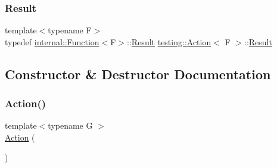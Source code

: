 \mbox{\label{classtesting_1_1_action_a9af08a21ad329331fde856cba9b6dea2}} 
\subsubsection{\texorpdfstring{Result}{Result}\hspace{0.1cm}{\footnotesize\ttfamily [3/3]}}
{\footnotesize\ttfamily template$<$typename F$>$ \\
typedef \mbox{\hyperlink{structtesting_1_1internal_1_1_function}{internal\+::\+Function}}$<$F$>$\+::\mbox{\hyperlink{classtesting_1_1_action_a9af08a21ad329331fde856cba9b6dea2}{Result}} \mbox{\hyperlink{classtesting_1_1_action}{testing\+::\+Action}}$<$ F $>$\+::\mbox{\hyperlink{classtesting_1_1_action_a9af08a21ad329331fde856cba9b6dea2}{Result}}}



\subsection{Constructor \& Destructor Documentation}
\mbox{\label{classtesting_1_1_action_a9e72d404d52a0c6d6edefac30f76e02d}} 
\subsubsection{\texorpdfstring{Action()}{Action()}\hspace{0.1cm}{\footnotesize\ttfamily [1/12]}}
{\footnotesize\ttfamily template$<$typename G $>$ \\
\mbox{\hyperlink{classtesting_1_1_action}{Action}} (\begin{DoxyParamCaption}{ }\end{DoxyParamCaption})\hspace{0.3cm}{\ttfamily [inline]}}

\mbox{\label{classtesting_1_1_action_a2f5924eb6c0113be8f226aa3630b2cc2}} 
